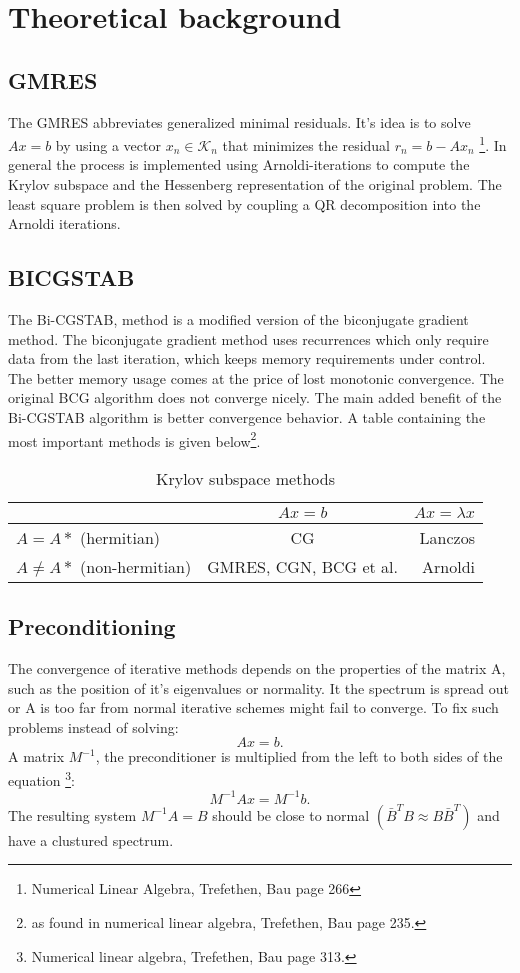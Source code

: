 \section{Theoretical background}
\subsection{GMRES}
The GMRES abbreviates generalized minimal residuals. It's idea is to solve $Ax = b$ by using a vector
$x_n \in \mathcal{K}_n$ that minimizes the residual $r_n = b - Ax_n$ \footnote{Numerical Linear Algebra, Trefethen, Bau page 266}.
In general the process is implemented using Arnoldi-iterations to compute the Krylov subspace and the Hessenberg representation of the
original problem. The least square problem is then solved by coupling a QR decomposition into the Arnoldi iterations. 

\subsection{BICGSTAB}
The Bi-CGSTAB, method is a modified version of the biconjugate gradient method. The biconjugate gradient method uses recurrences which only
require data from the last iteration, which keeps memory requirements under control. The better memory usage comes at the price of lost monotonic convergence. The original BCG algorithm does not converge nicely. The main added benefit of the Bi-CGSTAB algorithm is better convergence behavior. 
A table containing the most important methods is given below\footnote{ as found in numerical linear algebra, Trefethen, Bau page 235.}.

\begin{table}
\centering
\begin{tabular}{|l|c|r|} \hline
   						    & $Ax = b$ & $Ax = \lambda x$ \\ \hline
$A = A*$ (hermitian)        & CG	   &  Lanczos		   \\ \hline
$A \neq A*$ (non-hermitian) & GMRES, CGN, BCG et al. & Arnoldi \\ \hline
\end{tabular}
\caption{Krylov subspace methods}
\label{tab:KrySub}
\end{table}


\subsection{Preconditioning}
The convergence of iterative methods depends on the properties of the matrix A, such as the position of it's eigenvalues or normality. It the spectrum is spread out or A is too far from normal iterative schemes might fail to converge. To fix such problems instead of solving:
\begin{equation}
Ax = b.
\end{equation}
A matrix $M^{-1}$, the preconditioner is multiplied from the left to both sides of the equation \footnote{Numerical linear algebra, Trefethen, Bau page 313.}:
\begin{equation}
M^{-1} Ax = M^{-1}b. 
\end{equation} 
The resulting system $M^{-1}A = B$ should be close to normal $(\bar{B}^TB \approx B\bar{B}^T)$ and have a clustured spectrum. 